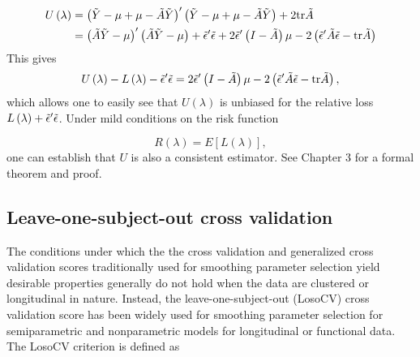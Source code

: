 \begin{align}
\begin{split}
U\left(\lambda\right) &= \left( \tilde{Y} - \mu + \mu - \tilde{A} \tilde{Y} \right)'\left( \tilde{Y} - \mu + \mu - \tilde{A} \tilde{Y} \right) + 2\mbox{tr}\tilde{A} \\
&= \left(\tilde{A} \tilde{Y} - \mu \right)'\left( \tilde{A} \tilde{Y} - \mu \right) + \tilde{\epsilon}'\tilde{\epsilon} + 2\tilde{\epsilon}' \left( I- \tilde{A}\right)\mu- 2\left( \tilde{\epsilon}'\tilde{A} \tilde{\epsilon} -  \mbox{tr}\tilde{A}\right)
\end{split}
\end{align}
\noindent
This gives
\begin{equation} 
U\left(\lambda\right) - L\left(\lambda\right) - \tilde{\epsilon}'\tilde{\epsilon}  =  2\tilde{\epsilon}' \left( I- \tilde{A}\right)\mu- 2\left( \tilde{\epsilon}'\tilde{A} \tilde{\epsilon} -  \mbox{tr}\tilde{A}\right), 
\end{equation}
 \noindent
 which allows one to easily see that $U\left(\lambda\right)$ is unbiased for the relative loss $L\left(\lambda\right) + \tilde{\epsilon}'\tilde{\epsilon}$.  Under mild conditions on the risk function
 
 \[
 R\left(\lambda\right) = E\left[L\left(\lambda\right)\right],
 \]
\noindent
one can establish that $U$ is also a consistent estimator. See \cite{gu2013smoothing} Chapter 3 for a formal theorem and proof.


\subsection{Leave-one-subject-out cross validation}  
The conditions under which the the cross validation and generalized cross validation scores traditionally used for smoothing parameter selection yield desirable properties generally do not hold when the data are clustered or longitudinal in nature. Instead, the leave-one-subject-out (LosoCV) cross validation score has been widely used for smoothing parameter selection for semiparametric and nonparametric models for longitudinal or functional data. The LosoCV criterion is defined as

